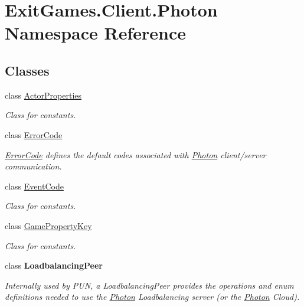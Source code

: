 \hypertarget{namespace_exit_games_1_1_client_1_1_photon}{}\section{Exit\+Games.\+Client.\+Photon Namespace Reference}
\label{namespace_exit_games_1_1_client_1_1_photon}
\subsection*{Classes}
\begin{DoxyCompactItemize}
\item 
class \hyperlink{class_exit_games_1_1_client_1_1_photon_1_1_actor_properties}{Actor\+Properties}
\begin{DoxyCompactList}\small\item\em Class for constants. \end{DoxyCompactList}\item 
class \hyperlink{class_exit_games_1_1_client_1_1_photon_1_1_error_code}{Error\+Code}
\begin{DoxyCompactList}\small\item\em \hyperlink{class_exit_games_1_1_client_1_1_photon_1_1_error_code}{Error\+Code} defines the default codes associated with \hyperlink{namespace_exit_games_1_1_client_1_1_photon}{Photon} client/server communication. \end{DoxyCompactList}\item 
class \hyperlink{class_exit_games_1_1_client_1_1_photon_1_1_event_code}{Event\+Code}
\begin{DoxyCompactList}\small\item\em Class for constants. \end{DoxyCompactList}\item 
class \hyperlink{class_exit_games_1_1_client_1_1_photon_1_1_game_property_key}{Game\+Property\+Key}
\begin{DoxyCompactList}\small\item\em Class for constants. \end{DoxyCompactList}\item 
class {\bfseries Loadbalancing\+Peer}
\begin{DoxyCompactList}\small\item\em Internally used by P\+UN, a Loadbalancing\+Peer provides the operations and enum definitions needed to use the \hyperlink{namespace_exit_games_1_1_client_1_1_photon}{Photon} Loadbalancing server (or the \hyperlink{namespace_exit_games_1_1_client_1_1_photon}{Photon} Cloud). \end{DoxyCompactList}\item 

\end{DoxyCompactItemize}
